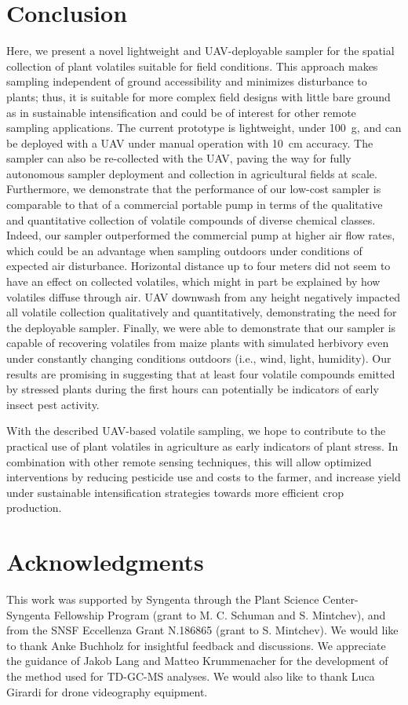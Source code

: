 \section{Conclusion}
Here, we present a novel lightweight and UAV-deployable sampler for the spatial collection of plant volatiles suitable for field conditions. This approach makes sampling independent of ground accessibility and minimizes disturbance to plants; thus, it is suitable for more complex field designs with little bare ground as in sustainable intensification and could be of interest for other remote sampling applications. The current prototype is lightweight, under 100~g, and can be deployed with a UAV under manual operation with 10~cm accuracy. The sampler can also be re-collected with the UAV, paving the way for fully autonomous sampler deployment and collection in agricultural fields at scale. Furthermore, we demonstrate that the performance of our low-cost sampler is comparable to that of a commercial portable pump in terms of the qualitative and quantitative collection of volatile compounds of diverse chemical classes. Indeed, our sampler outperformed the commercial pump at higher air flow rates, which could be an advantage when sampling outdoors under conditions of expected air disturbance. 
Horizontal distance up to four meters did not seem to have an effect on collected volatiles, which might in part be explained by how volatiles diffuse through air. 
UAV downwash from any height negatively impacted all volatile collection qualitatively and quantitatively, demonstrating the need for the deployable sampler. Finally, we were able to demonstrate that our sampler is capable of recovering volatiles from maize plants with simulated herbivory even under constantly changing conditions outdoors (i.e., wind, light, humidity). Our results are promising in suggesting that at least four volatile compounds emitted by stressed plants during the first hours can potentially be indicators of early insect pest activity.

With the described UAV-based volatile sampling, we hope to contribute to the practical use of plant volatiles in agriculture as early indicators of plant stress. In combination with other remote sensing techniques, this will allow optimized interventions by reducing pesticide use and costs to the farmer, and increase yield under sustainable intensification strategies towards more efficient crop production. 

\section*{Acknowledgments}
This work was supported by Syngenta through the Plant Science Center-Syngenta Fellowship Program (grant to M. C. Schuman and S. Mintchev), and from the SNSF Eccellenza Grant N.186865 (grant to S. Mintchev). We would like to thank Anke Buchholz for insightful feedback and discussions. We appreciate the guidance of Jakob Lang and Matteo Krummenacher for the  development of the method used for TD-GC-MS analyses. We would also like to thank Luca Girardi for drone videography equipment.

 
% 
% 
%

